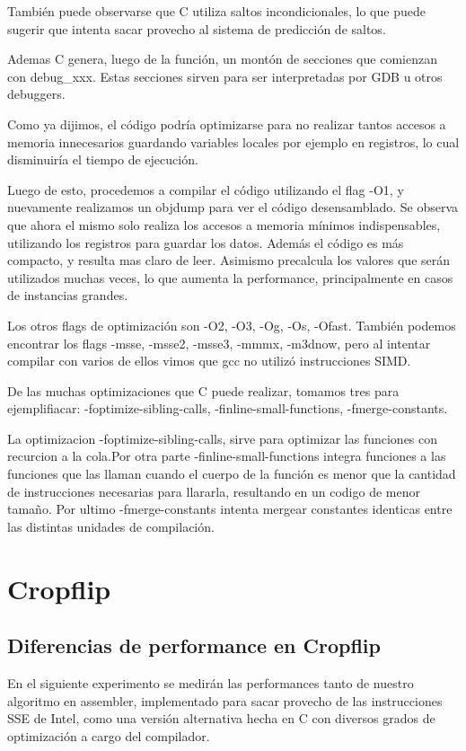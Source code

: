 \documentclass[a4paper]{article}
\begin{document}
También puede observarse que C utiliza saltos incondicionales, lo que puede sugerir que intenta sacar provecho al sistema de predicción de saltos.

Ademas C genera, luego de la función, un montón de secciones que comienzan con debug_xxx. Estas secciones sirven para ser interpretadas por GDB u otros debuggers.

Como ya dijimos, el código podría optimizarse para no realizar tantos accesos a memoria innecesarios guardando variables locales por ejemplo en registros, lo cual disminuiría el tiempo de ejecución.

Luego de esto, procedemos a compilar el código utilizando el flag -O1, y nuevamente realizamos un objdump para ver el código desensamblado. Se observa que ahora el mismo solo realiza los accesos a memoria mínimos indispensables, utilizando los registros para guardar los datos. Además el código es más compacto, y resulta mas claro de leer. Asimismo precalcula los valores que serán utilizados muchas veces, lo que aumenta la performance, principalmente en casos de instancias grandes.

Los otros flags de optimización son -O2, -O3, -Og, -Os, -Ofast. También podemos encontrar los flags -msse, -msse2, -msse3, -mmmx, -m3dnow, pero al intentar compilar con varios de ellos vimos que gcc no utilizó instrucciones SIMD.

De las muchas optimizaciones que C puede realizar, tomamos tres para ejemplifiacar: -foptimize-sibling-calls, -finline-small-functions, -fmerge-constants.

La optimizacion -foptimize-sibling-calls, sirve para optimizar las funciones con recurcion a la cola.Por otra parte -finline-small-functions integra funciones a las funciones que las llaman cuando el cuerpo de la función es menor que la cantidad de instrucciones necesarias para llararla, resultando en un codigo de menor tamaño. Por ultimo -fmerge-constants intenta mergear constantes identicas entre las distintas unidades de compilación.

\newpage

\section{Cropflip}

\subsection{Diferencias de performance en Cropflip}
En el siguiente experimento se medirán las performances tanto de nuestro algoritmo en assembler, implementado para sacar provecho de las instrucciones SSE de Intel, como una versión alternativa hecha en C con diversos grados de optimización a cargo del compilador.
\end{document}
